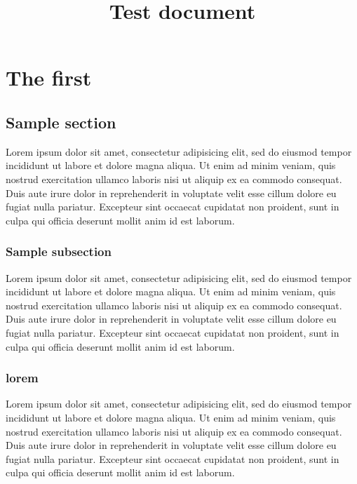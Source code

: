 \documentclass[]{memoir}
\title{Test document}
\begin{document}
\maketitle


\chapter{The first}
\section{Sample section}

Lorem ipsum dolor sit amet, consectetur adipisicing elit, sed do eiusmod
tempor incididunt ut labore et dolore magna aliqua. Ut enim ad minim veniam,
quis nostrud exercitation ullamco laboris nisi ut aliquip ex ea commodo
consequat. Duis aute irure dolor in reprehenderit in voluptate velit esse
cillum dolore eu fugiat nulla pariatur. Excepteur sint occaecat cupidatat non
proident, sunt in culpa qui officia deserunt mollit anim id est laborum.


\subsection{Sample subsection}

Lorem ipsum dolor sit amet, consectetur adipisicing elit, sed do eiusmod
tempor incididunt ut labore et dolore magna aliqua. Ut enim ad minim veniam,
quis nostrud exercitation ullamco laboris nisi ut aliquip ex ea commodo
consequat. Duis aute irure dolor in reprehenderit in voluptate velit esse
cillum dolore eu fugiat nulla pariatur. Excepteur sint occaecat cupidatat non
proident, sunt in culpa qui officia deserunt mollit anim id est laborum.

\subsection{lorem}


Lorem ipsum dolor sit amet, consectetur adipisicing elit, sed do eiusmod
tempor incididunt ut labore et dolore magna aliqua. Ut enim ad minim veniam,
quis nostrud exercitation ullamco laboris nisi ut aliquip ex ea commodo
consequat. Duis aute irure dolor in reprehenderit in voluptate velit esse
cillum dolore eu fugiat nulla pariatur. Excepteur sint occaecat cupidatat non
proident, sunt in culpa qui officia deserunt mollit anim id est laborum.
\end{document}
